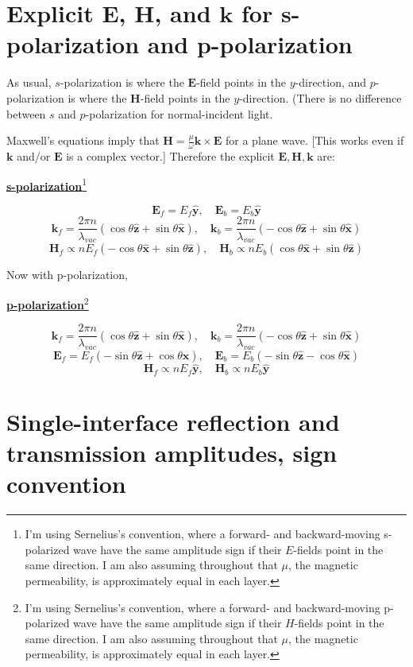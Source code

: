 \documentclass[12pt]{article}
\renewcommand{\(}{\left(}
\renewcommand{\)}{\right)}
\newcommand{\E}{\mathbf{E}}
\renewcommand{\H}{\mathbf{H}}
\renewcommand{\k}{\mathbf{k}}
\newcommand{\x}{\hat{\mathbf{x}}}
\newcommand{\y}{\hat{\mathbf{y}}}
\newcommand{\z}{\hat{\mathbf{z}}}
\begin{document}
\section{Explicit $\E$, $\H$, and $\k$ for s-polarization and p-polarization}

As usual, $s$-polarization is where the $\E$-field points in the $y$-direction, and $p$-polarization is where the $\H$-field points in the $y$-direction. (There is no difference between $s$ and $p$-polarization for normal-incident light.

Maxwell's equations imply that $\H = \frac{\mu}{\omega}\k \times \E$ for a plane wave. [This works even if $\k$ and/or $\E$ is a complex vector.] Therefore the explicit $\E,\H,\k$ are:

\begin{center} {\bf \underline{s-polarization}}\footnote{I'm using Sernelius's convention, where a forward- and backward-moving s-polarized wave have the same amplitude sign if their $E$-fields point in the same direction. I am also assuming throughout that $\mu$, the magnetic permeability, is approximately equal in each layer.}
 \end{center}
$$\E_f = E_f \y, \quad \E_b = E_b \y$$
$$\k_f =\frac{2\pi n}{\lambda_{vac}}\( \cos \theta \z + \sin \theta \x\), \quad \k_b = \frac{2\pi n}{\lambda_{vac}}\(- \cos \theta \z + \sin \theta \x\)$$
$$\H_f \propto  n E_f \( - \cos \theta \x +  \sin \theta \z\), \quad \H_b \propto n E_b\( \cos \theta \x + \sin \theta \z\)$$

Now with p-polarization,
\begin{center} {\bf \underline{p-polarization}}\footnote{I'm using Sernelius's convention, where a forward- and backward-moving p-polarized wave have the same amplitude sign if their $H$-fields point in the same direction. I am also assuming throughout that $\mu$, the magnetic permeability, is approximately equal in each layer.} \end{center}
$$\k_f =\frac{2\pi n}{\lambda_{vac}}\( \cos \theta \z + \sin \theta \x\), \quad \k_b = \frac{2\pi n}{\lambda_{vac}}\(- \cos \theta \z + \sin \theta \x\)$$
$$\E_f = E_f(-\sin \theta \z +  \cos \theta \x), \quad \E_b = E_b(- \sin \theta \z -  \cos \theta \x)$$
$$\H_f \propto n E_f \y, \quad \H_b \propto n E_b \y$$

\section{Single-interface reflection and transmission amplitudes, sign convention}
\end{document}
